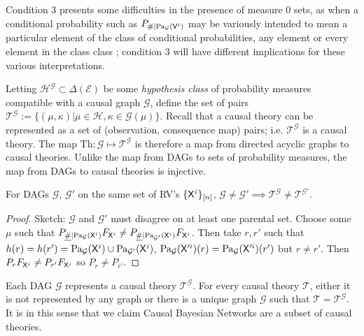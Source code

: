 Condition 3 presents some difficulties in the presence of measure 0 sets, as when a conditional probability such as $P_{\#|\text{Pa}_{\mathcal{G}}(\mathsf{V}^i)}$ may be variously intended to mean a particular element of the class of conditional probabilities, any element or every element in the class class \citep{cinlar_probability_2011}; condition 3 will have different implications for these various interpretations. 

Letting $\mathscr{H}^{\mathcal{G}}\subset\Delta(\mathcal{E})$ be some \emph{hypothesis class} of probability measures compatible with a causal graph $\mathcal{G}$, define the set of pairs $\mathscr{T}^{\mathcal{G}}:= \{(\mu,\kappa)|\mu\in \mathscr{H}, \kappa\in \mathcal{G}(\mu)\}$. Recall that a causal theory can be represented as a set of (observation, consequence map) pairs; i.e. $\mathscr{T}^{\mathcal{G}}$ is a causal theory. The map $\mathrm{Th}:\mathcal{G}\mapsto \mathscr{T}^{\mathcal{G}}$ is therefore a map from directed acyclic graphs to causal theories. Unlike the map from DAGs to sets of probability measures, the map from DAGs to causal theories is injective.

\begin{theorem}
For DAGs $\mathcal{G}$, $\mathcal{G}'$ on the same set of RV's $\{\mathsf{X}^i\}_{[n]}$, $\mathcal{G}\neq \mathcal{G}'\implies \mathscr{T}^{\mathcal{G}}\neq \mathscr{T}^{\mathcal{G}'}$.
\end{theorem}

\begin{proof}
Sketch: $\mathcal{G}$ and $\mathcal{G}'$ must disagree on at least one parental set. Choose some $\mu$ such that $P_{\underline{\#}|\text{Pa}_{\mathcal{G}}(\mathsf{X}^i)}F_{\mathsf{X}^i} \neq  P_{\underline{\#}|\text{Pa}_{\mathcal{G}'}(\mathsf{X}^i)}F_{\mathsf{X}^i}$. Then take $r,r'$ such that $h(r) = h(r') = \text{Pa}_{\mathcal{G}}(\mathsf{X}^i)\cup \text{Pa}_{\mathcal{G}'}(\mathsf{X}^i)$, $\text{Pa}_{\mathcal{G}}(\mathsf{X}'^i)(r) = \text{Pa}_{\mathcal{G}}(\mathsf{X}'^i)(r')$ but $r\neq r'$. Then $P_r F_{\mathsf{X}^i} \neq P_{r'} F_{\mathsf{X}^i}$ so $P_r\neq P_{r'}$.
\end{proof}

Each DAG $\mathcal{G}$ represents a causal theory $\mathscr{T}^\mathcal{G}$. For every causal theory $\mathscr{T}$, either it is not represented by any graph or there is a unique graph $\mathcal{G}$ such that $\mathscr{T}=\mathscr{T}^\mathcal{G}$. It is in this sense that we claim Causal Bayesian Networks are a subset of causal theories.


